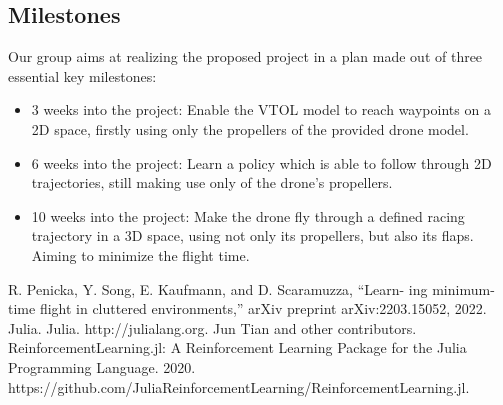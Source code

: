 \documentclass[conference]{IEEEtran}
\begin{document}
\subsection{Milestones} 
Our group aims at realizing the proposed project in a plan made out of three essential key milestones:
\begin{itemize}
  \item 3 weeks into the project: Enable the VTOL model to reach waypoints on a 2D space, firstly using only the propellers of the provided drone model.
  \item 6 weeks into the project: Learn a policy which is able to follow through 2D trajectories, still making use only of the drone's propellers.
  \item 10 weeks into the project: Make the drone fly through a defined racing trajectory in a 3D space, using not only its propellers, but also its flaps. Aiming to minimize the flight time.
\end{itemize}



\begin{thebibliography}{00}
R. Penicka, Y. Song, E. Kaufmann, and D. Scaramuzza, “Learn- ing minimum-time flight in cluttered environments,” arXiv preprint arXiv:2203.15052, 2022.
Julia. Julia. http://julialang.org.
Jun Tian and other contributors. ReinforcementLearning.jl: A Reinforcement Learning Package for the Julia Programming Language. 2020. https://github.com/JuliaReinforcementLearning/ReinforcementLearning.jl.


\end{thebibliography}
\vspace{12pt}
\textbf{}
\end{document}
